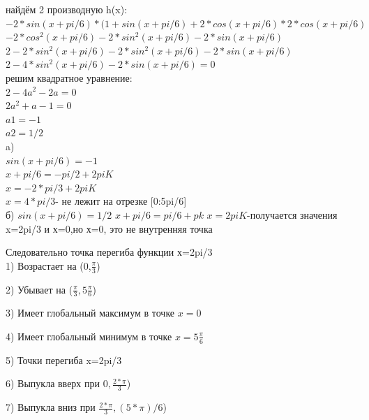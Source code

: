 \documentclass[russian,utf8,nocolumnxxxi,nocolumnxxxii]{eskdtext}
\begin{document}
найдём 2 производную h(x):\\
$-2*sin(x+pi/6)*(1+sin(x+pi/6)+2*cos(x+pi/6)*2*cos(x+pi/6)$\\
$-2*cos^2(x+pi/6)-2*sin^2(x+pi/6)-2*sin(x+pi/6)$\\
$2-2*sin^2(x+pi/6)-2*sin^2(x+pi/6)-2*sin(x+pi/6)$\\
$2-4*sin^2(x+pi/6)-2*sin(x+pi/6)=0$\\
\newpage
решим квадратное уравнение:\\
$2-4a^2-2a=0$\\
$2a^2+a-1=0$\\
$a1=-1$\\
$a2=1/2$\\
a)\\
$sin(x+pi/6)=-1$\\
$x+pi/6=-pi/2+2piK$\\
$x=-2*pi/3+2piK$\\
$x=4*pi/3$- не лежит на отрезке [0:5pi/6]\\

б)
$sin(x+pi/6)=1/2$
$x+pi/6=pi/6+pk$
$x=2piK$-получается значения x=2pi/3 и х=0,но х=0, это не внутренняя точка

Следовательно точка перегиба функции х=2pi/3\\

1) Возрастает на (0,$\frac{\pi}{3}$)

2) Убывает на ($\frac{\pi}{3},5\frac{\pi}{6}$)

3) Имеет глобальный максимум в точке $x=0$

4) Имеет глобальный минимум в точке $x=5\frac{\pi}{6}$

5) Точки перегиба x=2pi/3

6) Выпукла вверх при $0,\frac{2*\pi}{3}$)

7) Выпукла вниз при $\frac{2*\pi}{3},(5*\pi)/6$)
\end{document}
